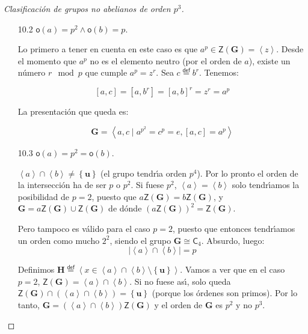 \documentclass[final,12pt,a4paper,twoside,fleqn]{extbook}
\newcommand{\entreparentesis}[1]{\ensuremath{
        \left({#1}\right)
}}
\newcommand{\entrecorchetes}[1]{\ensuremath{
        \left\lbrack{#1}\right\rbrack
}}
\newcommand{\entreangulos}[1]{\ensuremath{\left\langle{#1}\right\rangle}}
\newcommand{\mathdef}{\ensuremath{\stackrel{\mathsf{def}}{{}={}}}}
\newcommand{\set}[1]{\ensuremath{\left\lbrace{#1}\right\rbrace}}
\newcommand{\ly}{\ensuremath{         \wedge         }}
\newcommand{\generadoporUitem}[1]{\ensuremath{
        \entreangulos{#1}
}}
\newcommand{\generadopor}[1]{\ensuremath{
        \generadoporUitem{#1}
}}
\newcommand{\grG}{\ensuremath{\mathbf{G}}}
\newcommand{\grH}{\ensuremath{\mathbf{H}}}
\newcommand{\grN}{\ensuremath{\mathbf{N}}}
\newcommand{\grclass}[1]{\ensuremath{\mathsf{#1}}}
\newcommand{\cyclicgr}[1]{\ensuremath{{\grclass{C}}_{#1}}}
\newcommand{\centro}[1]{\ensuremath{
        {\mathsf{Z}}
        {\left({#1}\right)}
}}
\newcommand{\grderivado}[2]{\ensuremath{
        {#1}^{\entreparentesis{#2}}
}}
\newcommand{\conmutador}[2]{\ensuremath{
        \entrecorchetes{#1,#2}
}}
\newcommand{\neutromult}{\ensuremath{\mathbf{u}}}
\newcommand{\unity}{\ensuremath{\neutromult}}
\theoremstyle{definition}
\theoremstyle{remark}
\begin{document}
\begin{proof}[Clasificaci\'on de grupos no abelianos de orden $p^3$]
\begin{itemize}
\begin{itemize}
    Podemos suponer sin p\'erdida de generalidad que $a\in \grN\setminus\centro{\grG}$, ya que el centro tiene orden $p$ y $\grN$ tiene orden $p^2$, y este caso, $b\in \grG\setminus\grN$. Tenemos de otra parte que $z\in \grderivado{\grG}{1}=\centro{\grG}$, tambi\'en tiene orden $p$. De esta forma $\grG=\generadopor{z,a,b}$.
    Queda la siguiente presentaci\'on:
    \[
    \grG=\generadopor{a,b,z∣a^p=b^p=z^p=\unity, az=za, bz=zb,\conmutador{a}{b}=z}
    \]
    \item[10.2]
    \textbf{$\mathsf{o}(a)=p^2\ly\mathsf{o}(b)=p$}.

    Lo primero a tener en cuenta en este caso es que $a^p          \in \centro{\grG} = \generadopor{z}$. Desde el momento que $a^p$ no es el elemento neutro (por el orden de $a$), existe un n\'umero $r\mod p$ que cumple $a^p = z^r$.
    Sea $c \mathdef b^r$. Tenemos:

    \[ \conmutador{a}{c} = \conmutador{a}{b^r} = {\conmutador{a}{b}}^r = z^r = a^p \]

    La presentaci\'on que queda es:

    \[\grG=\generadopor{ a,c ∣a^{p^2} = c^p = e, \conmutador{a}{c} = a^p }\]
    \item[10.3]
    \textbf{$\mathsf{o}(a)=p^2=\mathsf{o}(b)$}.

    $\generadopor{a}         \cap \generadopor{b}         \neq         \set{\unity}$ (el grupo tendr{\'{\i}}a orden $p^4$). Por lo pronto el orden de la intersecci\'on ha de ser $p$ o $p^2$. Si fuese $p^2$, $\generadopor{a}=\generadopor{b}$ solo tendr{\'{\i}}amos la posibilidad de $p=2$, puesto que $a\centro{\grG}=b\centro{\grG}$, y $\grG=a\centro{\grG}         \cup         \centro{\grG}$ de d\'onde $\entreparentesis{a\centro{\grG}}^2=\centro{\grG}$.

    Pero tampoco es v\'alido para el caso $p=2$, puesto que entonces tendr{\'{\i}}amos un orden como mucho $2^2$, siendo el grupo $\grG         \cong         \cyclicgr{4}$. Absurdo, luego:
    \[
    \left|\generadopor{a}         \cap \generadopor{b}\right|=p
    \]

    Definimos $
    \grH\mathdef\generadopor{x         \in \generadopor{a}         \cap \generadopor{b}\setminus\set{\unity}}$. Vamos a ver que en el caso $p=2$, $\centro{\grG}=\generadopor{a}         \cap \generadopor{b}$.
    Si no fuese as{\'{\i}}, solo queda $\centro{\grG}         \cap \entreparentesis{\generadopor{a}         \cap \generadopor{b}}=\set{\unity}$ (porque los \'ordenes son primos). Por lo tanto, $\grG={\entreparentesis{\generadopor{a}         \cap \generadopor{b}}\centro{\grG}}$ y el orden de $\grG$ es $p^2$ y no $p^3$.


\end{itemize}
\end{itemize}
\end{proof}
\end{document}
